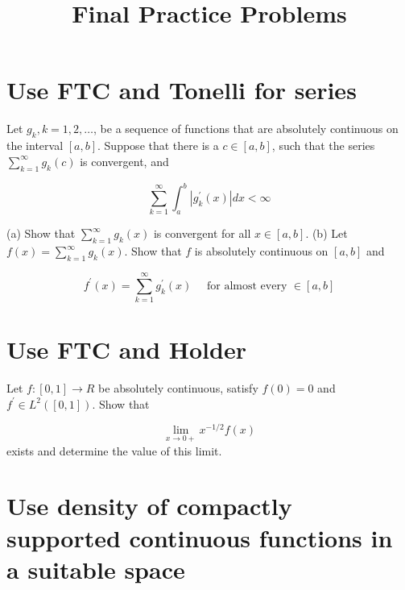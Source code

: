 \documentclass[lang=cn,11pt]{elegantbook}
\title{Final Practice Problems}
\begin{document}
\frontmatter
\mainmatter


\section{Use FTC and Tonelli for series}
Let $g_k, k=1,2, \ldots$, be a sequence of functions that are absolutely continuous on the interval $[a, b]$. Suppose that there is a $c \in[a, b]$, such that the series $\sum_{k=1}^{\infty} g_k(c)$ is convergent, and

$$
\sum_{k=1}^{\infty} \int_a^b\left|g_k^{\prime}(x)\right| d x<\infty
$$

(a) Show that $\sum_{k=1}^{\infty} g_k(x)$ is convergent for all $x \in[a, b]$.
(b) Let $f(x)=\sum_{k=1}^{\infty} g_k(x)$. Show that $f$ is absolutely continuous on $[a, b]$ and

$$
f^{\prime}(x)=\sum_{k=1}^{\infty} g_k^{\prime}(x) \quad \text { for almost every } \in[a, b]
$$
\newline
\newline
\newline
\newline
\newline
\newline
\newline
\newline
\newline



\section{Use FTC and Holder}
Let $f:[0,1] \rightarrow R$ be absolutely continuous, satisfy $f(0)=0$ and $f^{\prime} \in L^2([0,1])$. Show that

$$
\lim _{x \rightarrow 0+} x^{-1 / 2} f(x)
$$
exists and determine the value of this limit.
\newline
\newline
\newline
\newline
\newline
\newline
\newline
\newline
\newline


\section{Use density of compactly supported continuous functions in a suitable space}
\end{document}
